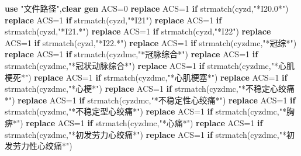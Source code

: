 \documentclass[
]{book}
\newenvironment{Shaded}{\begin{snugshade}}{\end{snugshade}}
\newcommand{\FunctionTok}[1]{\textcolor[rgb]{0.00,0.00,0.00}{#1}}
\newcommand{\KeywordTok}[1]{\textcolor[rgb]{0.13,0.29,0.53}{\textbf{#1}}}
\newcommand{\NormalTok}[1]{#1}
\newcommand{\StringTok}[1]{\textcolor[rgb]{0.31,0.60,0.02}{#1}}
\begin{document}
\begin{Shaded}
\begin{Highlighting}[]
\KeywordTok{use} \StringTok{"文件路径"}\NormalTok{,}\KeywordTok{clear}
\KeywordTok{gen}\NormalTok{ ACS=0}
\KeywordTok{replace}\NormalTok{ ACS=1 }\KeywordTok{if} \FunctionTok{strmatch}\NormalTok{(cyzd,}\StringTok{"*I20.0*"}\NormalTok{)}
\KeywordTok{replace}\NormalTok{ ACS=1 }\KeywordTok{if} \FunctionTok{strmatch}\NormalTok{(cyzd,}\StringTok{"*I21"}\NormalTok{)}
\KeywordTok{replace}\NormalTok{ ACS=1 }\KeywordTok{if} \FunctionTok{strmatch}\NormalTok{(cyzd,}\StringTok{"*I21.*"}\NormalTok{)}
\KeywordTok{replace}\NormalTok{ ACS=1 }\KeywordTok{if} \FunctionTok{strmatch}\NormalTok{(cyzd,}\StringTok{"*I22"}\NormalTok{)}
\KeywordTok{replace}\NormalTok{ ACS=1 }\KeywordTok{if} \FunctionTok{strmatch}\NormalTok{(cyzd,}\StringTok{"*I22.*"}\NormalTok{)}
\KeywordTok{replace}\NormalTok{ ACS=1 }\KeywordTok{if} \FunctionTok{strmatch}\NormalTok{(cyzdmc,}\StringTok{"*冠综*"}\NormalTok{)}
\KeywordTok{replace}\NormalTok{ ACS=1 }\KeywordTok{if} \FunctionTok{strmatch}\NormalTok{(cyzdmc,}\StringTok{"*冠脉综合*"}\NormalTok{)}
\KeywordTok{replace}\NormalTok{ ACS=1 }\KeywordTok{if} \FunctionTok{strmatch}\NormalTok{(cyzdmc,}\StringTok{"*冠状动脉综合*"}\NormalTok{)}
\KeywordTok{replace}\NormalTok{ ACS=1 }\KeywordTok{if} \FunctionTok{strmatch}\NormalTok{(cyzdmc,}\StringTok{"*心肌梗死*"}\NormalTok{)}
\KeywordTok{replace}\NormalTok{ ACS=1 }\KeywordTok{if} \FunctionTok{strmatch}\NormalTok{(cyzdmc,}\StringTok{"*心肌梗塞*"}\NormalTok{)}
\KeywordTok{replace}\NormalTok{ ACS=1 }\KeywordTok{if} \FunctionTok{strmatch}\NormalTok{(cyzdmc,}\StringTok{"*心梗*"}\NormalTok{)}
\KeywordTok{replace}\NormalTok{ ACS=1 }\KeywordTok{if} \FunctionTok{strmatch}\NormalTok{(cyzdmc,}\StringTok{"*不稳定心绞痛*"}\NormalTok{)}
\KeywordTok{replace}\NormalTok{ ACS=1 }\KeywordTok{if} \FunctionTok{strmatch}\NormalTok{(cyzdmc,}\StringTok{"*不稳定性心绞痛*"}\NormalTok{)}
\KeywordTok{replace}\NormalTok{ ACS=1 }\KeywordTok{if} \FunctionTok{strmatch}\NormalTok{(cyzdmc,}\StringTok{"*不稳定型心绞痛*"}\NormalTok{)}
\KeywordTok{replace}\NormalTok{ ACS=1 }\KeywordTok{if} \FunctionTok{strmatch}\NormalTok{(cyzdmc,}\StringTok{"*胸痹*"}\NormalTok{)}
\KeywordTok{replace}\NormalTok{ ACS=1 }\KeywordTok{if} \FunctionTok{strmatch}\NormalTok{(cyzdmc,}\StringTok{"*心痛*"}\NormalTok{)}
\KeywordTok{replace}\NormalTok{ ACS=1 }\KeywordTok{if} \FunctionTok{strmatch}\NormalTok{(cyzdmc,}\StringTok{"*初发劳力心绞痛*"}\NormalTok{)}
\KeywordTok{replace}\NormalTok{ ACS=1 }\KeywordTok{if} \FunctionTok{strmatch}\NormalTok{(cyzdmc,}\StringTok{"*初发劳力性心绞痛*"}\NormalTok{)}

\end{Highlighting}
\end{Shaded}
\end{document}
